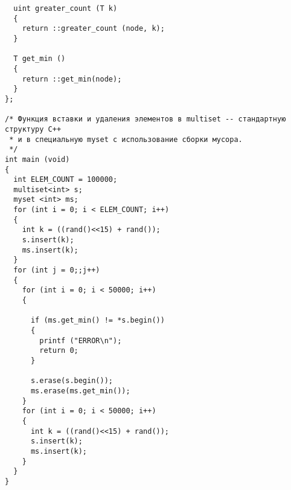 \begin{lstlisting}
  uint greater_count (T k)
  {
    return ::greater_count (node, k);
  }
 
  T get_min ()
  {
    return ::get_min(node);
  }
};
 
/* Функция вставки и удаления элементов в multiset -- стандартную структуру С++
 * и в специальную myset с использование сборки мусора. 
 */
int main (void)
{
  int ELEM_COUNT = 100000;
  multiset<int> s;
  myset <int> ms;
  for (int i = 0; i < ELEM_COUNT; i++)
  {
    int k = ((rand()<<15) + rand());
    s.insert(k);
    ms.insert(k);
  }
  for (int j = 0;;j++)
  {
    for (int i = 0; i < 50000; i++)
    {

      if (ms.get_min() != *s.begin())
      {
        printf ("ERROR\n");
        return 0;
      }

      s.erase(s.begin());
      ms.erase(ms.get_min());
    }
    for (int i = 0; i < 50000; i++)
    {
      int k = ((rand()<<15) + rand());
      s.insert(k);
      ms.insert(k);
    }
  }
}
\end{lstlisting}